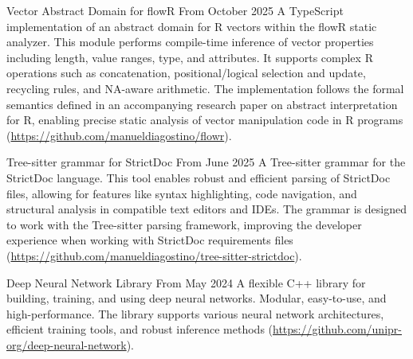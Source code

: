 

\begin{cventries}
  \cventrytool
  {Vector Abstract Domain for flowR}
  {From October 2025}
  {
    A TypeScript implementation of an abstract domain for R vectors
    within the flowR static analyzer.
    This module performs compile-time inference of vector properties
    including length, value ranges,
    type, and attributes. It supports complex R operations such as
    concatenation, positional/logical
    selection and update, recycling rules, and NA-aware arithmetic.
    The implementation
    follows the formal semantics defined in an accompanying research
    paper on abstract interpretation
    for R, enabling precise static analysis of vector manipulation
    code in R programs
    (\url{https://github.com/manueldiagostino/flowr}).
  }
\end{cventries}

\begin{cventries}
  \cventrytool
  {Tree-sitter grammar for StrictDoc}
  {From June 2025}
  {
    A Tree-sitter grammar for the StrictDoc language. This tool enables
    robust and efficient parsing of StrictDoc files, allowing for
    features like syntax highlighting, code navigation, and structural
    analysis in compatible text editors and IDEs. The grammar is
    designed to work with the Tree-sitter parsing framework, improving
    the developer experience when working with StrictDoc requirements
    files
    (\url{https://github.com/manueldiagostino/tree-sitter-strictdoc}).
  }
\end{cventries}

\begin{cventries}
  \cventrytool
  {Deep Neural Network Library}
  {From May 2024}
  {
    A flexible C++ library for building, training, and using deep neural
    networks. Modular, easy-to-use, and high-performance. The library
    supports various neural network architectures, efficient training
    tools, and robust inference methods
    (\url{https://github.com/unipr-org/deep-neural-network}).
  }
\end{cventries}
